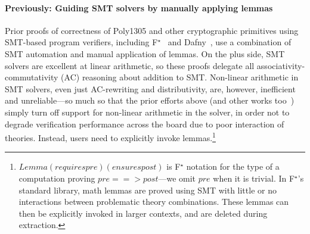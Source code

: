 \documentclass[runningheads]{llncs}
\newcommand\fstar{F$^\star$\xspace}
\newcommand{\comm}[3]{\ifcheckpagebudget\else\ifdraft{{\color{#1}[#2: #3]}}\fi\fi}
\newcommand{\ch}[1]{\comm{teal}{CH}{#1}}
\newcommand{\guido}[1]{\comm{blue}{Guido}{#1}}
\begin{document}
\paragraph{\bf Previously: Guiding SMT solvers by manually
  applying lemmas}

Prior proofs of correctness of Poly1305 and other cryptographic
primitives using SMT-based program verifiers, including
\fstar~\cite{haclstar} and Dafny~\cite{vale},
use a combination of SMT automation and manual application of lemmas.
%
On the plus side, SMT solvers are excellent at linear arithmetic, so
these proofs delegate all associativity-commutativity (AC) reasoning
about addition to SMT.
%
Non-linear arithmetic in SMT solvers, even just AC-rewriting and
distributivity, are, however, inefficient and unreliable---so much so
that the prior efforts above (and other works too~\cite{Ironclad,
  IronFleet})
simply turn off support for non-linear arithmetic
in the solver, in order not to degrade verification
performance across the board due to poor interaction of theories.
%
Instead, users need to explicitly invoke lemmas.\footnote{\ls$Lemma (requires
pre) (ensures post)$ is \fstar notation for the type of a %
computation proving \ls$pre ==> post$---we omit \ls$pre$ when it is
trivial. In \fstar's standard library, math lemmas are proved using
SMT with little or no interactions between problematic theory
combinations. These lemmas can then be explicitly invoked in larger
contexts, and are deleted during extraction.}
\end{document}
